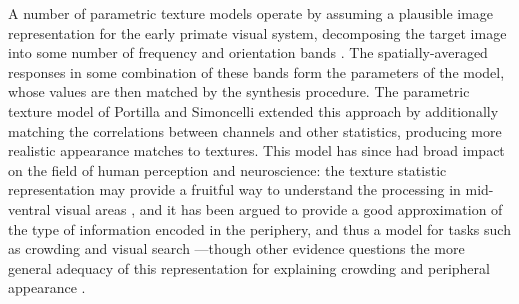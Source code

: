 \documentclass[article, 11pt,a4paper,natbib]{apa6}\usepackage[]{graphicx}\usepackage[]{color}
\begin{document}
A number of parametric texture models operate by assuming a plausible image representation for the early primate visual system, decomposing the target image into some number of frequency and orientation bands \citep{cano_texture_1988, porat_localized_1989, malik_preattentive_1990, heeger_pyramidbased_1995, simoncelli_texture_1998, zhu_filters_1998, portilla_parametric_2000}.
The spatially-averaged responses in some combination of these bands form the parameters of the model, whose values are then matched by the synthesis procedure.
The parametric texture model of Portilla and Simoncelli \citep{portilla_parametric_2000, simoncelli_texture_1998} extended this approach by additionally matching the correlations between channels and other statistics, producing more realistic appearance matches to textures.
This model has since had broad impact on the field of human perception and neuroscience: the texture statistic representation may provide a fruitful way to understand the processing in mid-ventral visual areas
\citep{ziemba_selectivity_2016,movshon_representation_2014,freeman_functionally_2013,freeman_functional_2013,freeman_metamers_2011, okazawa_image_2015}, and it has been argued to provide a good approximation of the type of information encoded in the periphery, and thus a model for tasks such as crowding and visual search \citep[][]{freeman_metamers_2011, keshvari_pooling_2016,rosenholtz_rethinking_2012,balas_summary-statistic_2009,rosenholtz_summary_2012,rosenholtz_what_2011}---though other evidence questions the more general adequacy of this representation for explaining crowding and peripheral appearance \citep{agaoglu_can_2016, clarke_visual_2014, herzog_crowding_2015, wallis_testing_2016}.
\end{document}
